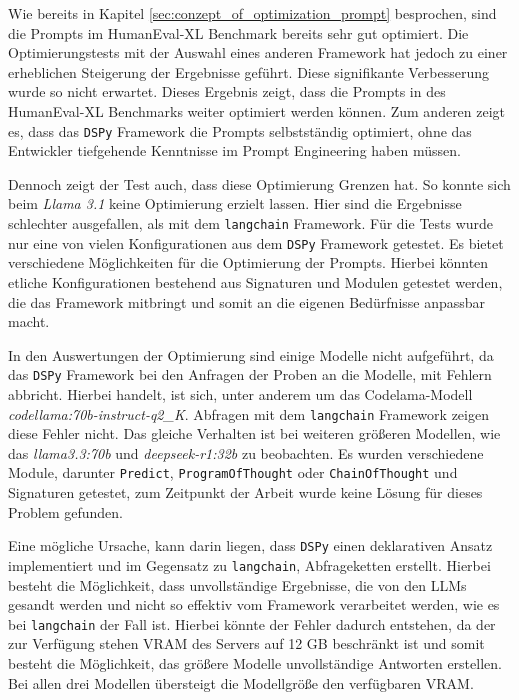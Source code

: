 Wie bereits in Kapitel \ref{sec:conzept_of_optimization_prompt} besprochen, sind die Prompts im HumanEval-XL Benchmark bereits sehr gut optimiert. Die Optimierungstests mit der Auswahl eines anderen Framework hat jedoch zu einer erheblichen Steigerung der Ergebnisse geführt. Diese signifikante Verbesserung wurde so nicht erwartet. Dieses Ergebnis zeigt, dass die Prompts in des HumanEval-XL Benchmarks weiter optimiert werden können. Zum anderen zeigt es, dass das \texttt{DSPy} Framework die Prompts selbstständig optimiert, ohne das Entwickler tiefgehende Kenntnisse im Prompt Engineering haben müssen.\vspace{0.2cm}

Dennoch zeigt der Test auch, dass diese Optimierung Grenzen hat. So konnte sich beim \textit{Llama 3.1} keine Optimierung erzielt lassen. Hier sind die Ergebnisse schlechter ausgefallen, als mit dem \texttt{langchain} Framework. Für die Tests wurde nur eine von vielen Konfigurationen aus dem \texttt{DSPy} Framework getestet. Es bietet verschiedene Möglichkeiten für die Optimierung der Prompts. Hierbei könnten etliche Konfigurationen bestehend aus Signaturen und Modulen getestet werden, die das Framework mitbringt und somit an die eigenen Bedürfnisse anpassbar macht.\vspace{0.2cm}

In den Auswertungen der Optimierung sind einige Modelle nicht aufgeführt, da das \texttt{DSPy} Framework bei den Anfragen der Proben an die Modelle, mit Fehlern abbricht. Hierbei handelt, ist sich, unter anderem um das Codelama-Modell \textit{codellama:70b-instruct-q2\_K}. Abfragen mit dem \texttt{langchain} Framework zeigen diese Fehler nicht. Das gleiche Verhalten ist bei weiteren größeren Modellen, wie das \textit{llama3.3:70b} und \textit{deepseek-r1:32b} zu beobachten. Es wurden verschiedene Module, darunter \texttt{Predict}, \texttt{ProgramOfThought} oder \texttt{ChainOfThought} und Signaturen getestet, zum Zeitpunkt der Arbeit wurde keine Lösung für dieses Problem gefunden.\vspace{0.2cm}

Eine mögliche Ursache, kann darin liegen, dass \texttt{DSPy} einen deklarativen Ansatz implementiert und im Gegensatz zu \texttt{langchain}, Abfrageketten erstellt. Hierbei besteht die Möglichkeit, dass unvollständige Ergebnisse, die von den LLMs gesandt werden und nicht so effektiv vom Framework verarbeitet werden, wie es bei \texttt{langchain} der Fall ist. Hierbei könnte der Fehler dadurch entstehen, da der zur Verfügung stehen VRAM des Servers auf 12 GB beschränkt ist und somit besteht die Möglichkeit, das größere Modelle unvollständige Antworten erstellen. Bei allen drei Modellen übersteigt die Modellgröße den verfügbaren VRAM.\vspace{0.2cm}

